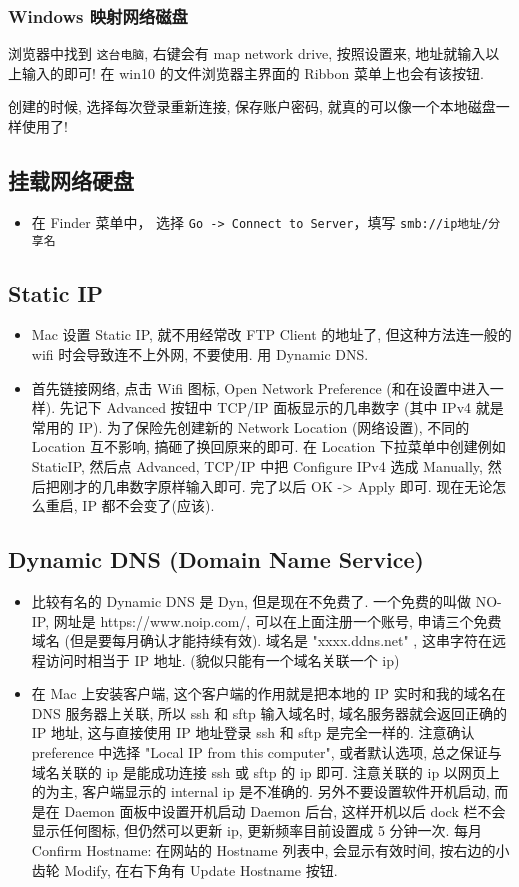 \subsubsection{Windows 映射网络磁盘}
浏览器中找到 \verb|这台电脑|, 右键会有 map network drive, 按照设置来, 地址就输入以上输入的即可! 在 win10 的文件浏览器主界面的 Ribbon 菜单上也会有该按钮.

创建的时候, 选择每次登录重新连接, 保存账户密码, 就真的可以像一个本地磁盘一样使用了!

\subsection{挂载网络硬盘}
\begin{itemize}
\item 在 Finder 菜单中， 选择 \verb`Go -> Connect to Server`，填写 \verb`smb://ip地址/分享名`
\end{itemize}

\subsection{Static IP}
\begin{itemize}
\item Mac 设置 Static IP, 就不用经常改 FTP Client 的地址了, 但这种方法连一般的 wifi 时会导致连不上外网, 不要使用. 用 Dynamic DNS.
\item 首先链接网络, 点击 Wifi 图标, Open Network Preference (和在设置中进入一样). 先记下 Advanced 按钮中 TCP/IP 面板显示的几串数字 (其中 IPv4 就是常用的 IP). 为了保险先创建新的 Network Location (网络设置), 不同的 Location 互不影响, 搞砸了换回原来的即可. 在 Location 下拉菜单中创建例如 StaticIP, 然后点 Advanced, TCP/IP 中把 Configure IPv4 选成 Manually, 然后把刚才的几串数字原样输入即可. 完了以后 OK -> Apply 即可. 现在无论怎么重启, IP 都不会变了(应该).
\end{itemize}

\subsection{Dynamic DNS (Domain Name Service)}
\begin{itemize}
\item 比较有名的 Dynamic DNS 是 Dyn, 但是现在不免费了. 一个免费的叫做 NO-IP, 网址是 https://www.noip.com/, 可以在上面注册一个账号, 申请三个免费域名 (但是要每月确认才能持续有效).  域名是 "xxxx.ddns.net"  , 这串字符在远程访问时相当于 IP 地址. (貌似只能有一个域名关联一个 ip)

\item 在 Mac 上安装客户端, 这个客户端的作用就是把本地的 IP 实时和我的域名在 DNS 服务器上关联, 所以 ssh 和 sftp 输入域名时, 域名服务器就会返回正确的 IP 地址, 这与直接使用 IP 地址登录 ssh 和 sftp 是完全一样的.
注意确认 preference 中选择 "Local IP from this computer", 或者默认选项, 总之保证与域名关联的 ip 是能成功连接 ssh 或 sftp 的 ip 即可. 注意关联的 ip 以网页上的为主, 客户端显示的 internal ip 是不准确的.
另外不要设置软件开机启动, 而是在 Daemon 面板中设置开机启动 Daemon 后台, 这样开机以后 dock 栏不会显示任何图标, 但仍然可以更新 ip, 更新频率目前设置成 5 分钟一次.
每月 Confirm Hostname: 在网站的 Hostname 列表中, 会显示有效时间, 按右边的小齿轮 Modify, 在右下角有 Update Hostname 按钮.
\end{itemize}
